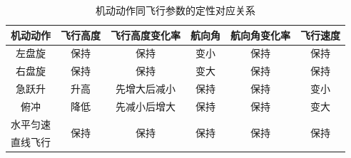 \documentclass{my_paper}
\begin{document}
\begin{table}[h]%
    \centering
    \caption{机动动作同飞行参数的定性对应关系}
    \vspace{10pt}
    \begin{tabular}{c|ccccc}
 \hline
 机动动作                    & 飞行高度                & 飞行高度变化率                 & 航向角                    & 航向角变化率              & 飞行速度                \\
 \hline
 左盘旋                     & 保持                  & 保持                      & 变小                     & 保持                  & 保持                  \\\hline
 右盘旋                     & 保持                  & 保持                      & 变大                     & 保持                  & 保持                  \\\hline
 急跃升                     & 升高                  & 先增大后减小                  & 保持                     & 保持                  & 变小                  \\\hline
 俯冲                      & 降低                  & 先减小后增大                  & 保持                     & 保持                  & 变大                  \\\hline
水平匀速                  & \multirow{2}{*}{保持} & \multirow{2}{*}{保持}     & \multirow{2}{*}{保持}    & \multirow{2}{*}{保持} & \multirow{2}{*}{保持} \\
直线飞行                   &                     &                         &                        &                     &                     \\\hline


\end{tabular}
\end{table}
\end{document}
